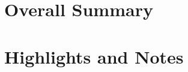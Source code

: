 \documentclass[openany,12pt]{book}
\begin{document}
\part{Overall Summary}
















\newpage
\part{Highlights and Notes}
\end{document}
